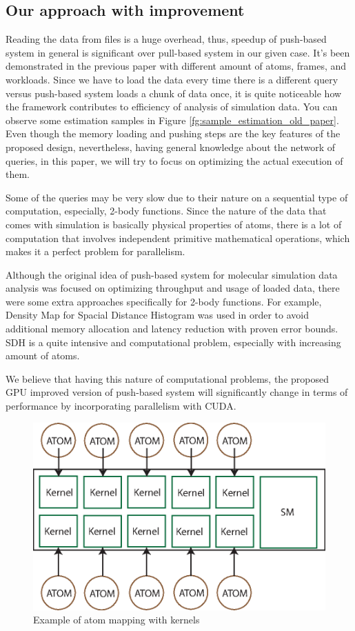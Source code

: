\documentclass[10pt,journal,final,letterpaper,twocolumn]{IEEEtran}
\begin{document}
\subsection{Our approach with improvement}

Reading the data from files is a huge overhead, thus, speedup of push-based system in general is significant over pull-based system in our given case. 
It's been demonstrated in the previous paper with different amount of atoms, frames, and workloads. Since we have to load the data every time there is a different query versus push-based system loads a chunk of data once, it is quite noticeable how the framework contributes to efficiency of analysis of simulation data. You can observe some estimation samples in Figure \ref{fg:sample_estimation_old_paper}. Even though the memory loading and pushing steps are the key features of the proposed design, nevertheless, having general knowledge about the network of queries, in this paper, we will try to focus on optimizing the actual execution of them.

Some of the queries may be very slow due to their nature on a sequential type of computation,  especially, 2-body functions. Since the nature of the data that comes with simulation is basically physical properties of atoms, there is a lot of computation that involves independent primitive mathematical operations, which makes it a perfect problem for parallelism.

Although the original idea of push-based system for molecular simulation data analysis was focused on optimizing throughput and usage of loaded data, there were some extra approaches specifically for 2-body functions. For example, Density Map for Spacial Distance Histogram was used in order to avoid additional memory allocation and latency reduction with proven error bounds. SDH is a quite intensive and computational problem, especially with increasing amount of atoms. 

We believe that having this nature of computational problems, the proposed GPU improved version of push-based system will significantly change in terms of performance by incorporating parallelism with CUDA.

\begin{figure}
\centering
\centerline{\includegraphics[width=0.5\columnwidth]{images/kernelatom.eps}}
\caption{ Example of atom mapping with kernels}
 \label{fg:kernelatom}


\end{figure}
\end{document}
